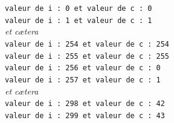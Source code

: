 \begin{exercice}
\begin{enumerate}
              \texttt{valeur de i : 0  et valeur de c : 0}\\
              \texttt{valeur de i : 1  et valeur de c : 1}\\
              \textit{et c\ae tera}\\
              \texttt{valeur de i : 254  et valeur de c : 254}\\
              \texttt{valeur de i : 255  et valeur de c : 255}\\
              \texttt{valeur de i : 256  et valeur de c : 0}\\
              \texttt{valeur de i : 257  et valeur de c : 1}\\
              \textit{et c\ae tera}\\
              \texttt{valeur de i : 298  et valeur de c : 42}\\
              \texttt{valeur de i : 299  et valeur de c : 43}\\
    \end{enumerate}
\end{exercice}

